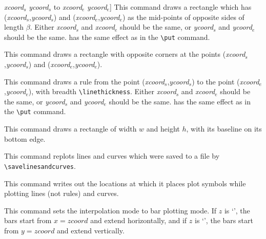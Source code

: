 \begin{syntax}
{\emph{xcoord}$_s$ \emph{ycoord}$_s$ to \emph{xcoord}$_e$ \emph{ycoord}$_e$}]
This command draws a rectangle which has (\emph{xcoord}$_s$,\emph{ycoord}$_s$) and
(\emph{xcoord}$_e$,\emph{ycoord}$_e$) as the mid-points of opposite sides of length $\beta$.
Either \emph{xcoord}$_s$ and \emph{xcoord}$_e$ should be the
same, or  \emph{ycoord}$_s$ and \emph{ycoord}$_e$ should be the same.
 has the same effect as in the \verb+\put+ command.
\item[{\tt\bsl putrectangle {\rm[}<\emph{xshift},\emph{yshift}>{\rm]} corners at
\emph{xcoord}$_s$ \emph{ycoord}$_s$ and \emph{xcoord}$_e$ \emph{ycoord}$_e$}]
This command draws a rectangle with opposite corners at the points
(\emph{xcoord}$_s$,\emph{ycoord}$_s$) and (\emph{xcoord}$_e$,\emph{ycoord}$_e$).
\item[{\tt\bsl putrule {\rm[}<\emph{xshift},\emph{yshift}>{\rm]} from
\emph{xcoord}$_s$ \emph{ycoord}$_s$ to \emph{xcoord}$_e$ \emph{ycoord}$_e$}]
This command draws a rule from the point
(\emph{xcoord}$_s$,\emph{ycoord}$_s$) to the point (\emph{xcoord}$_e$,\emph{ycoord}$_e$), with breadth
\verb+\linethickness+.
Either \emph{xcoord}$_s$ and \emph{xcoord}$_e$ should be the
same, or  \emph{ycoord}$_s$ and \emph{ycoord}$_e$ should be the same.
 has the same effect as in the \verb+\put+ command.
\item[\tt\bsl rectangle <$w$> <$h$>]
This command draws a rectangle of width $w$ and height $h$, with its baseline
on its bottom edge.
\item[\tt\bsl replot "\emph{file name}"]
This command replots lines and curves which were saved to a file by
\verb+\savelinesandcurves+.
\item[\tt\bsl savelinesandcurves on "\emph{file name}"]
This command writes out the locations at which it places plot symbols while
plotting lines (not rules) and curves.
\item[{\tt\linestack[l]{\bsl setbars {\rm[}<\emph{xshift},\emph{yshift}>{\rm]} breadth
<$\beta$> at $z$ = \emph{zcoord}\\
\quad{\rm[}baselabels ({\rm[}[{\rm[}$o_x${\rm]}{\rm[}$o_y${\rm]}]{\rm]}
{\rm[}<\emph{xshift},\emph{yshift}>{\rm]}){\rm]}\\
\quad{\rm[}endlabels ({\rm[}[{\rm[}$o_x${\rm]}{\rm[}$o_y${\rm]}]{\rm]}
{\rm[}<\emph{xshift},\emph{yshift}>{\rm]}){\rm]}}}]
This command sets the interpolation mode to bar plotting mode. If $z$ is
`', the bars start from $x=zcoord$ and extend horizontally, and if $z$
is `', the bars start from $y=zcoord$ and extend vertically.

\end{syntax}
